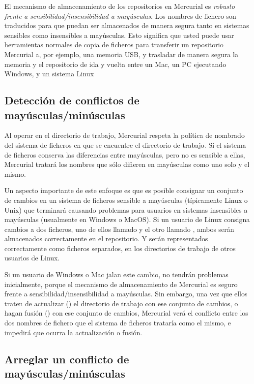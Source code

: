 El mecanismo de almacenamiento de los repositorios en Mercurial es
\emph{robusto frente a sensibilidad/insensibilidad a mayúsculas}. Los nombres de
fichero son traducidos para que puedan ser almacenados de manera
segura tanto en sistemas sensibles como insensibles a mayúsculas. Esto
significa que usted puede usar herramientas normales de copia de
ficheros para transferir un repositorio Mercurial a, por ejemplo, una
memoria USB, y trasladar de manera segura la memoria y el repositorio
de ida y vuelta entre un Mac, un PC ejecutando Windows, y un sistema
Linux

\subsection{Detección de conflictos de mayúsculas/minúsculas}

Al operar en el directorio de trabajo, Mercurial respeta la política
de nombrado del sistema de ficheros en que se encuentre el directorio
de trabajo. Si el sistema de ficheros conserva las diferencias entre
mayúsculas, pero no es sensible a ellas, Mercurial tratará los nombres
que sólo difieren en mayúsculas como uno solo y el mismo.

Un aspecto importante de este enfoque es que es posible consignar un
conjunto de cambios en un sistema de ficheros sensible a mayúsculas
(típicamente Linux o Unix) que terminará causando problemas para
usuarios en sistemas insensibles a mayúsculas (usualmente en Windows o
MacOS). Si un usuario de Linux consigna cambios a dos ficheros, uno de
ellos llamado  y el otro llamado ,
ambos serán almacenados correctamente en el repositorio. Y serán
representados correctamente como ficheros separados, en los
directorios de trabajo de otros usuarios de Linux.

Si un usuario de Windows o Mac jalan este cambio, no tendrán problemas
inicialmente, porque el mecanismo de almacenamiento de Mercurial es
seguro frente a sensibilidad/insensibilidad a mayúsculas. Sin embargo,
una vez que ellos traten de actualizar () el directorio
de trabajo con ese conjunto de cambios, o hagan fusión ()
con ese conjunto de cambios, Mercurial verá el conflicto entre los dos
nombres de fichero que el sistema de ficheros trataría como el mismo,
e impedirá que ocurra la actualización o fusión.

\subsection{Arreglar un conflicto de mayúsculas/minúsculas}

